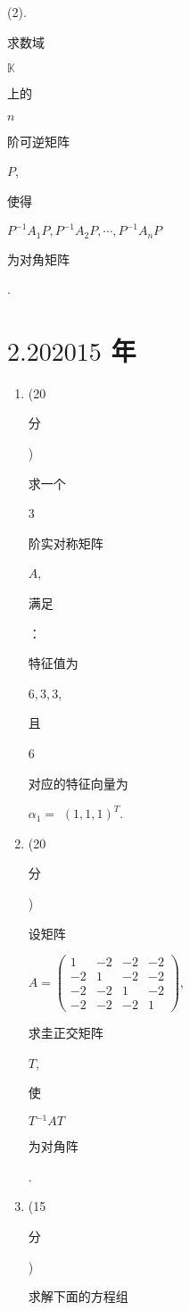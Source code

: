 \documentclass[10pt]{article}
\begin{document}
(2). \begin{CJK}{UTF8}{mj}求数域\end{CJK} $\mathbb{K}$ \begin{CJK}{UTF8}{mj}上的\end{CJK} $n$ \begin{CJK}{UTF8}{mj}阶可逆矩阵\end{CJK} $P$, \begin{CJK}{UTF8}{mj}使得\end{CJK} $P^{-1} A_{1} P, P^{-1} A_{2} P, \cdots, P^{-1} A_{n} P$ \begin{CJK}{UTF8}{mj}为对角矩阵\end{CJK}.

\section{$2.202015$ 年}
\begin{enumerate}
  \item (20 \begin{CJK}{UTF8}{mj}分\end{CJK}) \begin{CJK}{UTF8}{mj}求一个\end{CJK} 3 \begin{CJK}{UTF8}{mj}阶实对称矩阵\end{CJK} $A$, \begin{CJK}{UTF8}{mj}满足\end{CJK}：\begin{CJK}{UTF8}{mj}特征值为\end{CJK} $6,3,3$, \begin{CJK}{UTF8}{mj}且\end{CJK} 6 \begin{CJK}{UTF8}{mj}对应的特征向量为\end{CJK} $\alpha_{1}=$ $(1,1,1)^{T}$.

  \item (20 \begin{CJK}{UTF8}{mj}分\end{CJK}) \begin{CJK}{UTF8}{mj}设矩阵\end{CJK} $A=\left(\begin{array}{cccc}1 & -2 & -2 & -2 \\ -2 & 1 & -2 & -2 \\ -2 & -2 & 1 & -2 \\ -2 & -2 & -2 & 1\end{array}\right)$, \begin{CJK}{UTF8}{mj}求圭正交矩阵\end{CJK} $T$, \begin{CJK}{UTF8}{mj}使\end{CJK} $T{ }^{-1} A T$ \begin{CJK}{UTF8}{mj}为对角阵\end{CJK}.

  \item (15 \begin{CJK}{UTF8}{mj}分\end{CJK}) \begin{CJK}{UTF8}{mj}求解下面的方程组\end{CJK}

\end{enumerate}
\end{document}
